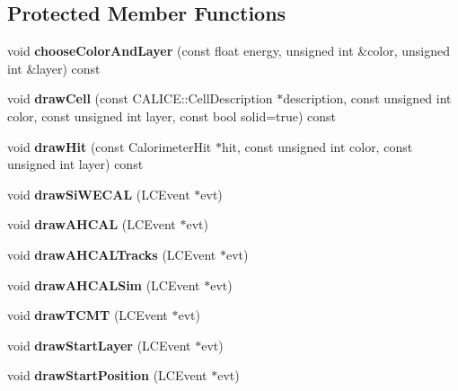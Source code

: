 \subsection*{Protected Member Functions}
\begin{DoxyCompactItemize}
\item 
void {\bfseries choose\-Color\-And\-Layer} (const float energy, unsigned int \&color, unsigned int \&layer) const \label{classCALICE_1_1EventDisplayProcessor_a7a616a6bbaaa216e2815a3cfbddb7203}

\item 
void {\bfseries draw\-Cell} (const C\-A\-L\-I\-C\-E\-::\-Cell\-Description $\ast$description, const unsigned int color, const unsigned int layer, const bool solid=true) const \label{classCALICE_1_1EventDisplayProcessor_a8c72e4ed7e45c5126de9d0a6a935a9b6}

\item 
void {\bfseries draw\-Hit} (const Calorimeter\-Hit $\ast$hit, const unsigned int color, const unsigned int layer) const \label{classCALICE_1_1EventDisplayProcessor_ab997ab7811aec0cb61ca9a5296796ea9}

\item 
void {\bfseries draw\-Si\-W\-E\-C\-A\-L} (L\-C\-Event $\ast$evt)\label{classCALICE_1_1EventDisplayProcessor_a282a9f9031e3952e9553e22331911935}

\item 
void {\bfseries draw\-A\-H\-C\-A\-L} (L\-C\-Event $\ast$evt)\label{classCALICE_1_1EventDisplayProcessor_af954c017bda60aa0c29a56801da58237}

\item 
void {\bfseries draw\-A\-H\-C\-A\-L\-Tracks} (L\-C\-Event $\ast$evt)\label{classCALICE_1_1EventDisplayProcessor_ae42429db28c5cef293f9cda49d98832e}

\item 
void {\bfseries draw\-A\-H\-C\-A\-L\-Sim} (L\-C\-Event $\ast$evt)\label{classCALICE_1_1EventDisplayProcessor_a695ddbd7d3de1cfc87141ec2f0f98119}

\item 
void {\bfseries draw\-T\-C\-M\-T} (L\-C\-Event $\ast$evt)\label{classCALICE_1_1EventDisplayProcessor_ac6ac2a1b2dff7057d26b3b7318c594fd}

\item 
void {\bf draw\-Start\-Layer} (L\-C\-Event $\ast$evt)
\item 
void {\bfseries draw\-Start\-Position} (L\-C\-Event $\ast$evt)\label{classCALICE_1_1EventDisplayProcessor_a2a0448c458baa43fb23291e86f7c9e0d}


\end{DoxyCompactItemize}
